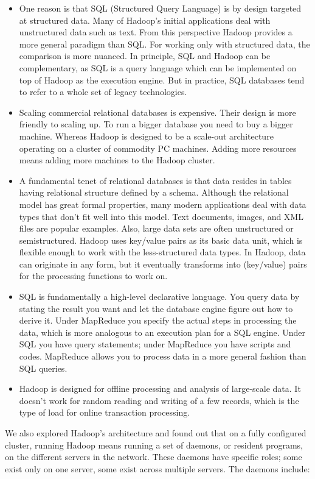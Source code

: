 \documentclass[twocolumn]{article}
\begin{document}
\begin{itemize}
\item One reason is that SQL (Structured Query Language) is by design targeted at structured
data. Many of Hadoop’s initial applications deal with unstructured data such as text. From
this perspective Hadoop provides a more general paradigm than SQL. For working only
with structured data, the comparison is more nuanced. In principle, SQL and Hadoop can be
complementary, as SQL is a query language which can be implemented on top of Hadoop
as the execution engine. But in practice, SQL databases tend to refer to a whole set of legacy
technologies.
\item Scaling commercial relational databases is expensive. Their design is more friendly to
scaling up. To run a bigger database you need to buy a bigger machine. Whereas Hadoop
is designed to be a scale-out architecture operating on a cluster of commodity PC
machines. Adding more resources means adding more machines to the Hadoop cluster.
\item A fundamental tenet of relational databases is that data resides in tables having relational
structure defined by a schema. Although the relational model has great formal properties,
many modern applications deal with data types that don’t fit well into this model. Text
documents, images, and XML files are popular examples. Also, large data sets are often
unstructured or semistructured. Hadoop uses key/value pairs as its basic data unit, which is
flexible enough to work with the less-structured data types. In Hadoop, data can originate in any
form, but it eventually transforms into (key/value) pairs for the processing functions to
work on.
\item SQL is fundamentally a high-level declarative language. You query data by stating the result
you want and let the database engine figure out how to derive it. Under MapReduce you specify
the actual steps in processing the data, which is more analogous to an execution plan for a SQL
engine. Under SQL you have query statements; under MapReduce you have scripts and codes.
MapReduce allows you to process data in a more general fashion than SQL queries.
\item Hadoop is designed for offline processing and analysis of large-scale data. It doesn’t work for
random reading and writing of a few records, which is the type of load for online transaction
processing.
\end{itemize}

We also explored Hadoop’s architecture and found out that on a fully configured cluster, running
Hadoop means running a set of daemons, or resident programs, on the different servers in the
network. These daemons have specific roles; some exist only on one server, some exist across multiple
servers. The daemons include:
\end{document}
